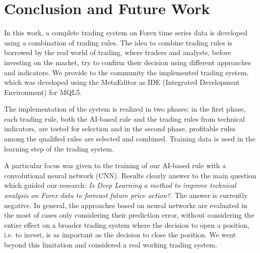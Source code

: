 \documentclass[1p]{elsarticle}
\begin{document}

















\section{Conclusion and Future Work}
\label{sec:conclusion}

In this work, a complete trading system on Forex time series data is developed using a combination of trading rules. The idea to combine trading rules is borrowed by the real world of trading, where traders and analysts, before investing on the market, try to confirm their decision using different approaches and indicators. We provide to the community the implemented trading system, which was developed using the MetaEditor as IDE (Integrated Development Environment) for MQL5.

The implementation of the system is realized in two phases: in the first phase, each trading rule, both the AI-based rule and the trading rules from technical indicators, are tested for selection and in the second phase, profitable rules among the qualified rules are selected and combined. Training data is used in the learning step of the trading system.

A particular focus was given to the training of our AI-based rule with a convolutional neural network (CNN). Results clearly answer to the main question which guided our research: \textit{Is Deep Learning a method to improve technical analysis on Forex data to forecast future price action?}. The answer is currently negative. In general, the approaches based on neural networks are evaluated in the most of cases only considering their prediction error, without considering the entire effect on a broader trading system where the decision to open a position, i.e. to invest, is as important as the decision to close the position. We went beyond this limitation and considered a real working trading system.
\end{document}
